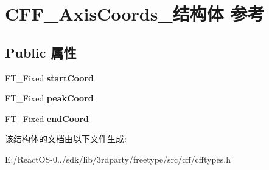 \hypertarget{struct_c_f_f___axis_coords__}{}\section{C\+F\+F\+\_\+\+Axis\+Coords\+\_\+结构体 参考}
\label{struct_c_f_f___axis_coords__}
\subsection*{Public 属性}
\begin{DoxyCompactItemize}
\item 
\mbox{\label{struct_c_f_f___axis_coords___aa75dfb662743a8e1dd407ff9903a4fd5}} 
F\+T\+\_\+\+Fixed {\bfseries start\+Coord}
\item 
\mbox{\label{struct_c_f_f___axis_coords___aac0bb03e226fd511b25d8c90a27cbf70}} 
F\+T\+\_\+\+Fixed {\bfseries peak\+Coord}
\item 
\mbox{\label{struct_c_f_f___axis_coords___af304cfc14fb03c67c4e137b75e6823b1}} 
F\+T\+\_\+\+Fixed {\bfseries end\+Coord}
\end{DoxyCompactItemize}


该结构体的文档由以下文件生成\+:\begin{DoxyCompactItemize}
\item 
E\+:/\+React\+O\+S-\/0../sdk/lib/3rdparty/freetype/src/cff/cfftypes.\+h\end{DoxyCompactItemize}
